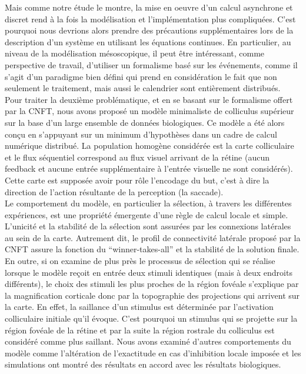 Mais comme notre étude le montre, la mise en oeuvre d'un calcul asynchrone et discret rend à la fois la modélisation et l'implémentation plus compliquées. C'est pourquoi nous devrions alors prendre des précautions supplémentaires lors de la description d'un système en utilisant les équations continues. En particulier, au niveau de la modélisation mésoscopique, il peut être intéressant, comme perspective de travail, d'utiliser un formalisme basé sur les événements, comme il s'agit d'un paradigme bien défini qui prend en considération le fait que non seulement le traitement, mais aussi le calendrier sont entièrement distribués. \\%


Pour traiter la deuxième problématique, et en se basant sur le formalisme offert par la CNFT, nous avons proposé un modèle minimaliste de colliculus supérieur sur la base d'un large ensemble de données biologiques. Ce modèle a été alors conçu en s'appuyant sur un minimum d'hypothèses dans un cadre de calcul numérique distribué. La population homogène considérée est la carte colliculaire et le flux séquentiel correspond au flux visuel arrivant de la rétine (aucun feedback et aucune entrée supplémentaire à l'entrée visuelle ne sont considérés). Cette carte est supposée avoir pour rôle l'encodage du but, c'est à dire la direction de l'action résultante de la perception (la saccade). \\ %

Le comportement du modèle, en particulier la sélection, à travers les différentes expériences, est une propriété émergente d'une règle de calcul locale et simple. L'unicité et la stabilité de la sélection sont assurées par les connexions latérales au sein de la carte. Autrement dit, le profil de connectivité latérale proposé par la CNFT assure la fonction du ``winner-takes-all'' et la stabilité de la solution finale. En outre, si on examine de plus près le processus de sélection qui se réalise lorsque le modèle reçoit en entrée deux stimuli identiques (mais à deux endroits différents), le choix des stimuli les plus proches de la région fovéale s'explique par la magnification corticale donc par la topographie des projections qui arrivent sur la carte. En effet, la saillance d'un stimulus est déterminée par l'activation colliculaire initiale qu'il évoque. C'est pourquoi un stimulus qui se projette sur la région fovéale de la rétine et par la suite la région rostrale du colliculus est considéré comme plus saillant. Nous avons examiné d'autres comportements du modèle comme l'altération de l'exactitude en cas d'inhibition locale imposée et les simulations ont montré des résultats en accord avec les résultats biologiques.\\%

